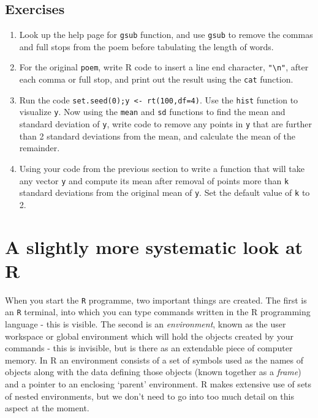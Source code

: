 \documentclass[10pt] {article}
\theoremstyle{definition}
\begin{document}
\subsection*{Exercises}

\begin{enumerate}
\item Look up the help page for {\tt gsub} function, and use {\tt gsub} to remove the commas and full stops from the poem before tabulating the length of words. 
\item For the original {\tt poem}, write R code to insert a line end character, \lstinline+"\n"+, after each comma or full stop, and print out the result using the {\tt cat} function.
\item Run the code \lstinline+set.seed(0);y <- rt(100,df=4)+. Use the {\tt hist} function to visualize {\tt y}. Now using the {\tt mean} and {\tt sd} functions to find the mean and standard deviation of {\tt y}, write code to remove any points in {\tt y} that are further than 2 standard deviations from the mean, and calculate the mean of the remainder.
\item Using your code from the previous section to write a function that will take any vector {\tt y} and compute its mean after removal of points more than {\tt k} standard deviations from the original mean of {\tt y}. Set the default value of {\tt k} to 2.

\end{enumerate}



\section{A slightly more systematic look at R}

When you start the {\tt R} programme, two important things are created. The first is an {\tt R} terminal, into which you can type commands written in the R programming language - this is visible. The second is an {\em environment}, known as the user workspace or global environment which will hold the objects created by your commands - this is invisible, but is there as an extendable piece of computer memory. In R an environment consists of a set of symbols used as the names of objects along with the data defining those objects (known together as a {\em frame}) and a pointer to an enclosing `parent' environment. R makes extensive use of sets of nested environments, but we don't need to go into too much detail on this aspect at the moment.
\end{document}
